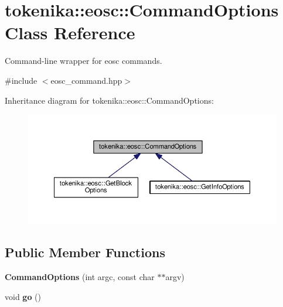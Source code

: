 \hypertarget{classtokenika_1_1eosc_1_1_command_options}{}\section{tokenika\+:\+:eosc\+:\+:Command\+Options Class Reference}
\label{classtokenika_1_1eosc_1_1_command_options}


Command-\/line wrapper for eosc commands.  




{\ttfamily \#include $<$eosc\+\_\+command.\+hpp$>$}



Inheritance diagram for tokenika\+:\+:eosc\+:\+:Command\+Options\+:
\nopagebreak
\begin{figure}[H]
\begin{center}
\leavevmode
\includegraphics[width=350pt]{classtokenika_1_1eosc_1_1_command_options__inherit__graph}
\end{center}
\end{figure}
\subsection*{Public Member Functions}
\begin{DoxyCompactItemize}
\item 
\mbox{\label{classtokenika_1_1eosc_1_1_command_options_a263a61f90aa324090e2d9d592b2d4ad6}} 
{\bfseries Command\+Options} (int argc, const char $\ast$$\ast$argv)
\item 
\mbox{\label{classtokenika_1_1eosc_1_1_command_options_a4fa1c9defc45b139e415c79c43b15e5d}} 
void {\bfseries go} ()
\end{DoxyCompactItemize}
